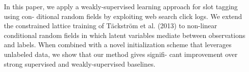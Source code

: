 In this paper, we apply a weakly-supervised learning approach for slot tagging using con- ditional random fields by exploiting web search click logs. We extend the constrained lattice training of Täckström et al. (2013) to non-linear conditional random fields in which latent variables mediate between observations and labels. When combined with a novel initialization scheme that leverages unlabeled data, we show that our method gives signifi- cant improvement over strong supervised and weakly-supervised baselines.
